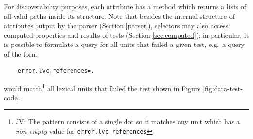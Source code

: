 \documentclass[10pt, a4paper]{article}
\newcommand{\py}[1]{{\tt #1}}
\newcommand{\jv}[1]{{\color{svlinks} JV: #1}}
\begin{document}
For discoverability purposes, each attribute has a method which returns a lists of all valid paths
inside its structure.
Note that besides the internal structure of attributes output by the parser (Section \ref{parser}),
selectors may also access computed properties and results of tests (Section \ref{sec:computed});
in particular, it is possible to formulate a query for all units that failed a given test,
e.g.\ a query of the form
\begin{verbatim}
    error.lvc_references=.
\end{verbatim}
would match\footnote{\jv{The pattern consists of a single dot so it matches any unit which has a \emph{non-empty} value
for \py{error.lvc\_references}}} all lexical units that failed the test shown in Figure \ref{fig:data-test-code}.
\end{document}
